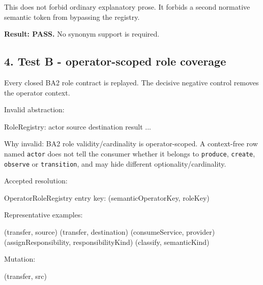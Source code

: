 \documentclass[
  10pt,
  a4paper,
]{article}
\newenvironment{Shaded}{}{}
\newcommand{\NormalTok}[1]{#1}
\begin{document}
This does not forbid ordinary explanatory prose. It forbids a second
normative semantic token from bypassing the registry.

\textbf{Result: PASS.} No synonym support is required.

\subsection{4. Test B - operator-scoped role
coverage}\label{test-b---operator-scoped-role-coverage}

Every closed BA2 role contract is replayed. The decisive negative
control removes the operator context.

Invalid abstraction:

\begin{Shaded}
\begin{Highlighting}[]
\NormalTok{RoleRegistry:}
\NormalTok{  actor}
\NormalTok{  source}
\NormalTok{  destination}
\NormalTok{  result}
\NormalTok{  ...}
\end{Highlighting}
\end{Shaded}

Why invalid: BA2 role validity/cardinality is operator-scoped. A
context-free row named \texttt{actor} does not tell the consumer whether
it belongs to \texttt{produce}, \texttt{create}, \texttt{observe} or
\texttt{transition}, and may hide different optionality/cardinality.

Accepted resolution:

\begin{Shaded}
\begin{Highlighting}[]
\NormalTok{OperatorRoleRegistry entry key:}
\NormalTok{  (semanticOperatorKey, roleKey)}
\end{Highlighting}
\end{Shaded}

Representative examples:

\begin{Shaded}
\begin{Highlighting}[]
\NormalTok{(transfer, source)}
\NormalTok{(transfer, destination)}
\NormalTok{(consumeService, provider)}
\NormalTok{(assignResponsibility, responsibilityKind)}
\NormalTok{(classify, semanticKind)}
\end{Highlighting}
\end{Shaded}

Mutation:

\begin{Shaded}
\begin{Highlighting}[]
\NormalTok{(transfer, src)}
\end{Highlighting}
\end{Shaded}
\end{document}
